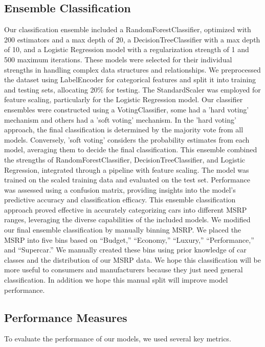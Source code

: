 \documentclass{article}
\begin{document}
\subsection{Ensemble Classification}
Our classification ensemble included a RandomForestClassifier, optimized with 200 estimators and a max depth of 20, a DecisionTreeClassifier with a max depth of 10, and a Logistic Regression model with a regularization strength of 1 and 500 maximum iterations. These models were selected for their individual strengths in handling complex data structures and relationships.
\newline
\newline
We preprocessed the dataset using LabelEncoder for categorical features and split it into training and testing sets, allocating 20\% for testing. The StandardScaler was employed for feature scaling, particularly for the Logistic Regression model. Our classifier ensembles were constructed using a VotingClassifier, some had a 'hard voting' mechanism and others had a 'soft voting' mechanism. In the 'hard voting' approach, the final classification is determined by the majority vote from all models. Conversely, 'soft voting' considers the probability estimates from each model, averaging them to decide the final classification. This ensemble combined the strengths of RandomForestClassifier, DecisionTreeClassifier, and Logistic Regression, integrated through a pipeline with feature scaling.
The model was trained on the scaled training data and evaluated on the test set. Performance was assessed using a confusion matrix, providing insights into the model's predictive accuracy and classification efficacy. This ensemble classification approach proved effective in accurately categorizing cars into different MSRP ranges, leveraging the diverse capabilities of the included models.
\newline
\newline
We modified our final ensemble classification by manually binning MSRP. We placed the MSRP into five bins based on “Budget,” “Economy,” “Luxury,” “Performance,” and “Supercar.” We manually created these bins using prior knowledge of car classes and the distribution of our MSRP data. We hope this classification will be more useful to consumers and manufacturers because they just need general classification. In addition we hope this manual split will improve model performance.

\subsection{Performance Measures}
To evaluate the performance of our models, we used several key metrics.
\end{document}
